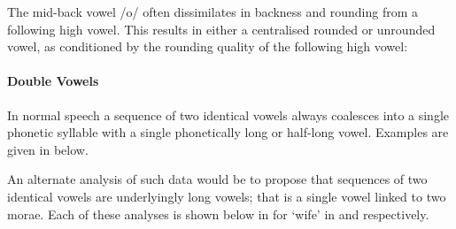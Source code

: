 The mid-back vowel /o/ often dissimilates in backness and rounding from a following high vowel.
This results in either a centralised rounded or unrounded vowel,
as conditioned by the rounding quality of the following high vowel:

\begin{exe}
\end{exe}

\paragraph{Double Vowels}\label{sec:DouVow}
In normal speech a sequence of two identical vowels always
coalesces into a single phonetic syllable with a
single phonetically long or half-long vowel.
Examples are given in  below.

\begin{exe}
\end{exe}

An alternate analysis of such data would be to propose that
sequences of two identical vowels are underlyingly long vowels;
that is a single vowel linked to two morae.
Each of these analyses is shown below in for  `wife'
in  and  respectively.

